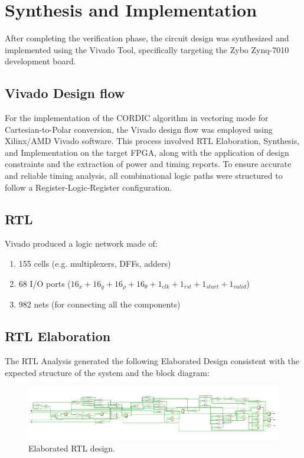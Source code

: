 \chapter{Synthesis and Implementation}
After completing the verification phase, the circuit design was synthesized and implemented using the Vivado Tool, specifically targeting the Zybo Zynq-7010 development board.

\section{Vivado Design flow}
For the implementation of the CORDIC algorithm in vectoring mode for Cartesian-to-Polar conversion, the Vivado design flow was employed using Xilinx/AMD Vivado software. This process involved RTL Elaboration, Synthesis, and Implementation on the target FPGA, along with the application of design constraints and the extraction of power and timing reports. To ensure accurate and reliable timing analysis, all combinational logic paths were structured to follow a Register-Logic-Register configuration.

\section{RTL}
Vivado produced a logic network made of:

\begin{enumerate}
    \item 155 cells (e.g. multiplexers, DFFs, adders)
    \item 68 I/O ports ($16_{x} + 16_{y} + 16_{\rho} + 16_{\theta} + 1_{clk} + 1_{rst} + 1_{start} + 1_{valid}$)
    \item 982 nets (for connecting all the components)
\end{enumerate}

\section{RTL Elaboration}
The RTL Analysis generated the following Elaborated Design consistent with the expected structure of the system and the block diagram:
\begin{figure}[H]
    \centering
    \includegraphics[width=\textwidth]{./images/Synthesis/schematic.pdf}
    \caption{Elaborated RTL design.}
    \label{fig:schematic}
\end{figure}

